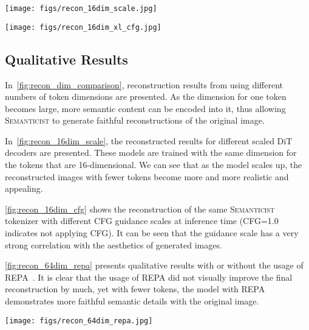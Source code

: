 \documentclass[10pt,twocolumn,letterpaper]{article}
\DeclareRobustCommand{\modelname}{\textsc{Semanticist}\xspace}
\begin{document}
\begin{figure*}[t]
    \centering
    \texttt{[image: figs/recon\_16dim\_scale.jpg]}
    \caption{Qualitative results of different DiT decoder scales (DiT-B/2, DiT-L/2, and DiT-XL/2) with d16$\times$256 tokens. The quality of images generated with fewer tokens improves consistently as the decoder scales up.}
    \label{fig:recon_16dim_scale}
\end{figure*}

\begin{figure*}[t]
    \centering
    \texttt{[image: figs/recon\_16dim\_xl\_cfg.jpg]}
    \caption{Qualitative results of different CFG guidance scales for DiT decoder, which clearly controls image aesthetics.}
    \label{fig:recon_16dim_cfg}
\end{figure*}

\subsection{Qualitative Results}

In~\cref{fig:recon_dim_comparison}, reconstruction results from using different numbers of token dimensions are presented.
As the dimension for one token becomes large, more semantic content can be encoded into it, thus allowing \modelname to generate faithful reconstructions of the original image.

In~\cref{fig:recon_16dim_scale}, the reconstructed results for different scaled DiT decoders are presented. 
These models are trained with the same dimension for the tokens that are 16-dimensional.
We can see that as the model scales up, the reconstructed images with fewer tokens become more and more realistic and appealing.

\cref{fig:recon_16dim_cfg} shows the reconstruction of the same \modelname tokenizer with different CFG guidance scales at inference time (CFG=1.0 indicates not applying CFG). It can be seen that the guidance scale has a very strong correlation with the aesthetics of generated images.

\cref{fig:recon_64dim_repa} presents qualitative results with or without the usage of REPA~\cite{repa}.
It is clear that the usage of REPA did not visually improve the final reconstruction by much, yet with fewer tokens, the model with REPA demonstrates more faithful semantic details with the original image.

\begin{figure*}[t]
    \centering
    \texttt{[image: figs/recon\_64dim\_repa.jpg]}
    \caption{Qualitative results on effects of REPA (with d64$\times$64 concept tokens). Instead of improving final reconstruction much, the benefit of REPA is mainly attributed to more faithful semantics in intermediate results.}
    \label{fig:recon_64dim_repa}
\end{figure*}
\end{document}
